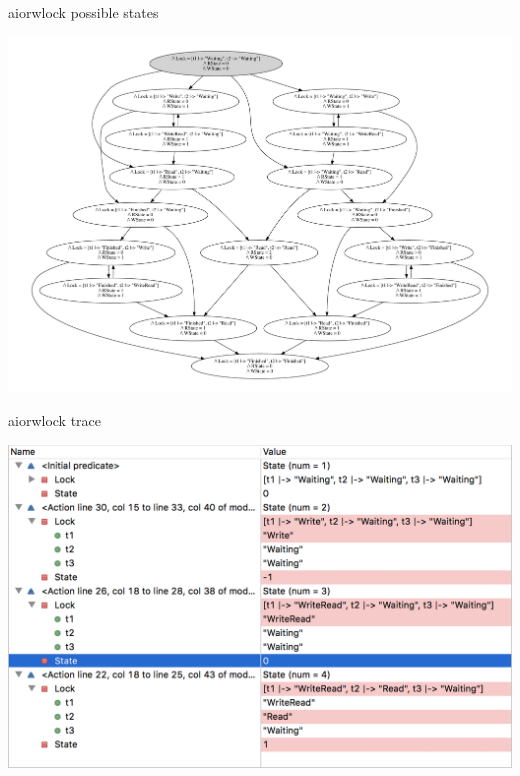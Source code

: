 \documentclass[12pt]{beamer}
\begin{document}
  \begin{frame}{aiorwlock possible states}
      \begin{center}
          \includegraphics[scale=0.35,angle=90]{figures/aiorwlock_model}
      \end{center}
  \end{frame}
  \begin{frame}{aiorwlock trace}
      \begin{center}
          \includegraphics[scale=0.50]{figures/tla_trace}
      \end{center}
  \end{frame}
\end{document}
